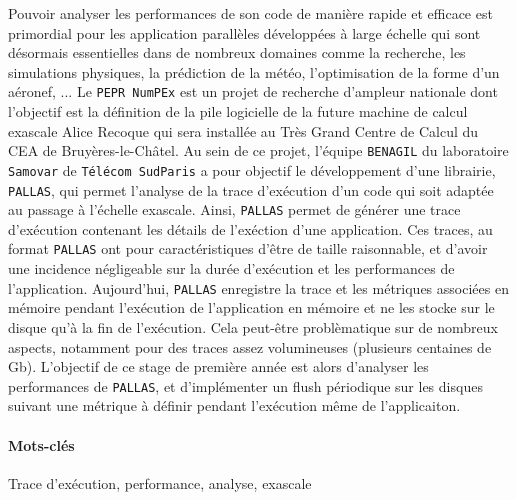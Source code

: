 

Pouvoir analyser les performances de son code de manière rapide et efficace est primordial pour les application parallèles développées à large échelle qui sont désormais essentielles dans de nombreux domaines comme la recherche, les simulations physiques, la prédiction de la météo, l'optimisation de la forme d'un aéronef, ... \newline
Le \verb!PEPR NumPEx! est un projet de recherche d'ampleur nationale dont l'objectif est la définition de la pile logicielle de la future machine de calcul exascale Alice Recoque qui sera installée au Très Grand Centre de Calcul du CEA de Bruyères-le-Châtel. Au sein de ce projet, l'équipe \verb!BENAGIL! du laboratoire \verb!Samovar! de \verb!Télécom SudParis! 
a pour objectif le développement d'une librairie, \verb!PALLAS!, qui permet l'analyse de la trace d'exécution d'un code qui soit adaptée au passage à l'échelle exascale. Ainsi, \verb!PALLAS! permet de générer une trace d'exécution contenant les détails de l'exéction d'une application. Ces traces, au format \verb!PALLAS! ont pour caractéristiques d'être de taille raisonnable, 
et d'avoir une incidence négligeable sur la durée d'exécution et les performances de l'application.\newline
Aujourd'hui, \verb!PALLAS! enregistre la trace et les métriques associées en mémoire pendant l'exécution de l'application en mémoire et ne les stocke sur le disque qu'à la fin de l'exécution. Cela peut-être problèmatique sur de nombreux aspects, notamment pour des traces assez volumineuses (plusieurs centaines de Gb).
L'objectif de ce stage de première année est alors d'analyser les performances de \verb!PALLAS!, et d'implémenter un flush périodique sur les disques suivant une métrique à définir pendant l'exécution même de l'applicaiton.



\paragraph*{Mots-clés}\label{par:mots-cles}


Trace d'exécution, performance, analyse, exascale
